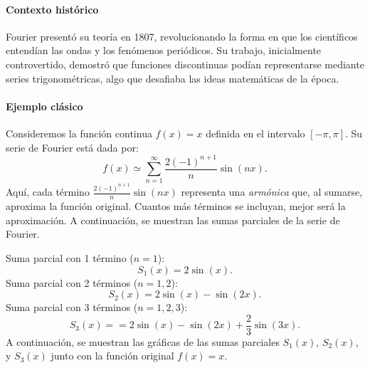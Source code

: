 \documentclass[12pt, a4paper]{article}
\theoremstyle{rioplatense}
\begin{document}
\paragraph{Contexto histórico}
Fourier presentó su teoría en 1807, revolucionando la forma en que los científicos entendían las ondas y los fenómenos periódicos. Su trabajo, inicialmente controvertido, demostró que funciones discontinuas podían representarse mediante series trigonométricas, algo que desafiaba las ideas matemáticas de la época.

\paragraph{Ejemplo clásico}
Consideremos la función continua $f(x) = x$ definida en el intervalo $[-\pi, \pi]$. Su serie de Fourier está dada por:
$$
f(x) \simeq \sum_{n=1}^{\infty} \frac{2(-1)^{n+1}}{n} \sin(nx).
$$
Aquí, cada término $\frac{2(-1)^{n+1}}{n} \sin(nx)$ representa una \textit{armónica} que, al sumarse, aproxima la función original. Cuantos más términos se incluyan, mejor será la aproximación.
%
A continuación, se muestran las sumas parciales de la serie de Fourier. %

\medskip

\noindent
{Suma parcial con 1 término (\( n = 1 \))}:
\[
S_1(x) %
= 2 \sin(x).
\]
{Suma parcial con 2 términos (\( n = 1, 2 \))}:
\[
S_2(x) %
= 2 \sin(x) - \sin(2x).
\]
{Suma parcial con 3 términos (\( n = 1, 2, 3 \))}:
\[
S_3(x) = %
= 2 \sin(x) - \sin(2x) + \frac{2}{3} \sin(3x).
\]
%
A continuación, se muestran las gráficas de las sumas parciales \( S_1(x) \), \( S_2(x) \), y \( S_3(x) \) junto con la función original \( f(x) = x \).
\end{document}
